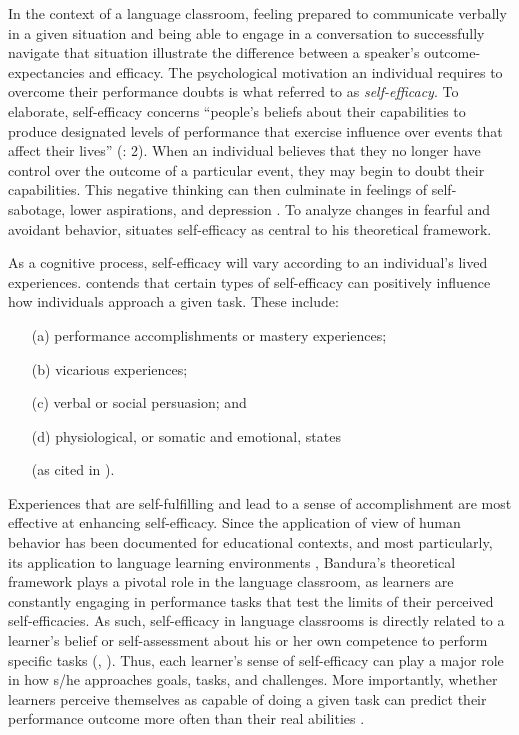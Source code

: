 \documentclass[output=paper]{langscibook}
\begin{document}
In the context of a language classroom, feeling prepared to communicate verbally in a given situation and being able to engage in a conversation to successfully navigate that situation illustrate the difference between a speaker’s outcome-expectancies and efficacy. The psychological motivation an individual requires to overcome their performance doubts is what \citet{Bandura1977} referred to as \textit{self-efficacy}. To elaborate, self-efficacy concerns “people’s beliefs about their capabilities to produce designated levels of performance that exercise influence over events that affect their lives” (\citealt{Bandura1994}: 2). When an individual believes that they no longer have control over the outcome of a particular event, they may begin to doubt their capabilities. This negative thinking can then culminate in feelings of self-sabotage, lower aspirations, and depression \citep{Weibell2011}. To analyze changes in fearful and avoidant behavior, \citet{Bandura1997} situates self-efficacy as central to his theoretical framework.

As a cognitive process, self-efficacy will vary according to an individual’s lived experiences. \citet{Bandura1997} contends that certain types of self-efficacy can positively influence how individuals approach a given task. These include:

\begin{itemize}
\item[(a)] performance accomplishments or mastery experiences;
\item[(b)] vicarious experiences;
\item[(c)] verbal or social persuasion; and
\item[(d)] physiological, or somatic and emotional, states

(as cited in \citealt[200]{Weibell2011}).
\end{itemize}
Experiences that are self-fulfilling and lead to a sense of accomplishment are most effective at enhancing self-efficacy. Since the application of  view of human behavior has been documented for educational contexts, and most particularly, its application to language learning environments \citep{Wenden1998}, Bandura’s theoretical framework plays a pivotal role in the language classroom, as learners are constantly engaging in performance tasks that test the limits of their perceived self-efficacies. As such, self-efficacy in language classrooms is directly related to a learner’s belief or self-assessment about his or her own competence to perform specific tasks (\citealt{Bandura1986}, \citeyear{Bandura1997}). Thus, each learner’s sense of self-efficacy can play a major role in how s/he approaches goals, tasks, and challenges. More importantly, whether learners perceive themselves as capable of doing a given task can predict their performance outcome more often than their real abilities \citep{Bandura1997}.
\end{document}
